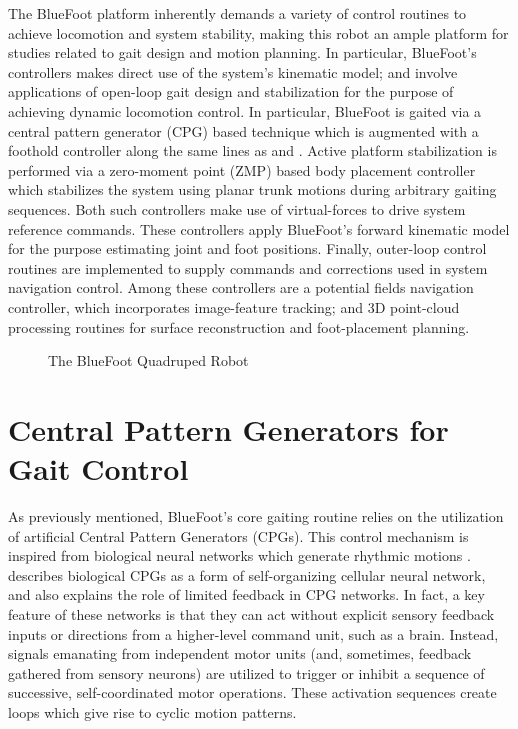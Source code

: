 		The BlueFoot platform inherently demands a variety of control routines to achieve locomotion and system stability, making this robot an ample platform for studies related to gait design and motion planning. In particular, BlueFoot's controllers makes direct use of the system's kinematic model; and involve applications of open-loop gait design and stabilization for the purpose of achieving dynamic locomotion control. In particular, BlueFoot is gaited via a central pattern generator (CPG) based technique which is augmented with a foothold controller along the same lines as \cite{Ajallooeian2013} and \cite{Rutishauser2008}. Active platform stabilization is performed via a zero-moment point (ZMP) based body placement controller which stabilizes the system using planar trunk motions during arbitrary gaiting sequences. Both such controllers make use of virtual-forces to drive system reference commands. These controllers apply BlueFoot's forward kinematic model for the purpose estimating joint and foot positions. Finally, outer-loop control routines are implemented to supply commands and corrections used in system navigation control. Among these controllers are a potential fields navigation controller, which incorporates image-feature tracking; and 3D point-cloud processing routines for surface reconstruction and foot-placement planning.
	
			\begin{figure}[h!]
				\centering
				\caption{The BlueFoot Quadruped Robot}
				\label{fig::bluefoot_glamour}
			\end{figure}





	\section{Central Pattern Generators for Gait Control}

		As previously mentioned, BlueFoot's core gaiting routine relies on the utilization of artificial Central Pattern Generators (CPGs). This control mechanism is inspired from biological neural networks which generate rhythmic motions \cite{Ijspeert2008}. \cite{Arena2000} describes biological CPGs as a form of self-organizing cellular neural network, and also explains the role of limited feedback in CPG networks. In fact, a key feature of these networks is that they can act without explicit sensory feedback inputs or directions from a higher-level command unit, such as a brain. Instead, signals emanating from independent motor units (and, sometimes, feedback gathered from sensory neurons) are utilized to trigger or inhibit a sequence of successive, self-coordinated motor operations. These activation sequences create loops which give rise to cyclic motion patterns. 

